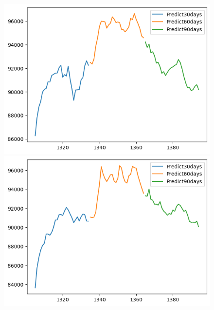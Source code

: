 \begin{figure}[H]
\begin{minipage}{0.15\textwidth}
    \includegraphics[width=1\textwidth]{resources/chapter-5/newdata1/predicted/VCB_NBeats_8-2_30days.png}
    \end{minipage}
    \hfill
        \begin{minipage}{0.15\textwidth}
    \centering
    \includegraphics[width=1\textwidth]{resources/chapter-5/newdata1/predicted/VCB_NBeats_9-1_30days.png}
    \end{minipage}
    \hfill
    \begin{minipage}{0.15\textwidth}
    \centering

\end{minipage}
\end{figure}
